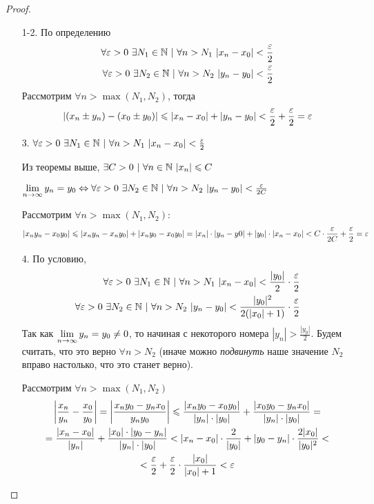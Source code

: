 \begin{proof}
\begin{enumerate}
    \item[1-2.] 
    По определению
    \begin{align*}
        \forall \eps > 0\ \exists N_1 \in \N\ |\ \forall n > N_1\ |x_n - x_0| < \frac{\eps}{2}
        \\
        \forall \eps > 0\ \exists N_2 \in \N\ |\ \forall n > N_2\ |y_n - y_0| < \frac{\eps}{2}
    \end{align*}
    Рассмотрим $\forall n > \max(N_1, N_2)$, тогда
    $$
        |(x_n \pm y_n) - (x_0 \pm y_0)| \leqslant |x_n - x_0| + |y_n - y_0| < \frac{\varepsilon}{2} + \frac{\varepsilon}{2} = \varepsilon
    $$
    \item[3.] 
    $\forall \varepsilon > 0\ \exists N_1 \in \mathbb{N}\ |\ \forall n > N_1\ |x_n - x_0| < \frac{\varepsilon}{2}$
    
    Из теоремы выше, $\exists C > 0\ |\ \forall n \in \N\ |x_n| \le C$
    
    $\lim\limits_{n \to \infty} y_n = y_0 \Leftrightarrow \forall \varepsilon > 0\ \exists N_2 \in \mathbb{N}\ |\ \forall n > N_2\ |y_n - y_0| < \frac{\varepsilon}{2C}$
    
    Рассмотрим $\forall n > \max(N_1, N_2)$:
    $$
        |x_n y_n - x_0 y_0| \leqslant |x_n y_n - x_n y_0| + |x_n y_0 - x_0 y_0| = |x_n| \cdot |y_n - y0| + |y_0| \cdot |x_n - x_0| < C \cdot \frac{\varepsilon}{2C} + \frac{\varepsilon}{2} = \varepsilon
    $$
    \item[4.]
    По условию,
    \begin{align*}
    	\forall \eps > 0\ \exists N_1 \in \N\ |\ \forall n > N_1\ |x_n - x_0| < \frac{|y_0|}{2} \cdot \frac{\eps}{2}
    	\\
    	\forall \eps > 0\ \exists N_2 \in \N\ |\ \forall n > N_2\ |y_n - y_0| < \frac{|y_0|^2}{2(|x_0| + 1)} \cdot \frac{\eps}{2}
    \end{align*}
    Так как $\lim\limits_{n \to \infty} y_n = y_0 \neq 0$, то начиная с некоторого номера $|y_n| > \frac{|y_0|}{2}$. Будем считать, что это верно $\forall n > N_2$ (иначе можно \textit{подвинуть} наше значение $N_2$ вправо настолько, что это станет верно).
   	
    Рассмотрим $\forall n > \max(N_1, N_2)$
    \begin{multline*}
        \left|\frac{x_n}{y_n} - \frac{x_0}{y_0}\right| = \left|\frac{x_n y_0 - y_n x_0}{y_n y_0}\right| \leqslant \frac{|x_n y_0 - x_0 y_0|}{|y_n| \cdot |y_0|} + \frac{|x_0 y_0 - y_n x_0|}{|y_n| \cdot |y_0|} =
        \\
        = \frac{|x_n - x_0|}{|y_n|} + \frac{|x_0| \cdot |y_0 - y_n|}{|y_n| \cdot |y_0|} < |x_n - x_0|\cdot \frac{2}{|y_0|} + |y_0 - y_n| \cdot \frac{2|x_0|}{|y_0|^2} <
        \\
        < \frac{\varepsilon}{2} + \frac{\varepsilon}{2} \cdot \frac{|x_0|}{|x_0| + 1} < \varepsilon
    \end{multline*}
\end{enumerate}
\end{proof}